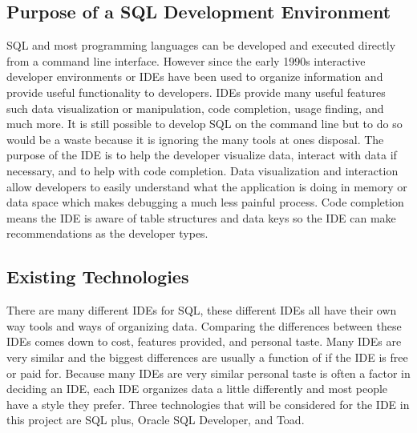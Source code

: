 \documentclass[draftclsnofoot, onecolumn, compsoc, 10pt]{IEEEtran}
\begin{document}
\subsection{Purpose of a SQL Development Environment}
SQL and most programming languages can be developed and executed directly from a command line interface.
However since the early 1990s interactive developer environments or IDEs have been used to organize information and provide useful functionality to developers.
IDEs provide many useful features such data visualization or manipulation, code completion, usage finding, and much more. 
It is still possible to develop SQL on the command line but to do so would be a waste because it is ignoring the many tools at ones disposal. 
The purpose of the IDE is to help the developer visualize data, interact with data if necessary, and to help with code completion.
Data visualization and interaction allow developers to easily understand what the application is doing in memory or data space which makes debugging a much less painful process.
Code completion means the IDE is aware of table structures and data keys so the IDE can make recommendations as the developer types.

\subsection{Existing Technologies}
There are many different IDEs for SQL, these different IDEs all have their own way tools and ways of organizing data. 
Comparing the differences between these IDEs comes down to cost, features provided, and personal taste.
Many IDEs are very similar and the biggest differences are usually a function of if the IDE is free or paid for. 
Because many IDEs are very similar personal taste is often a factor in deciding an IDE, each IDE organizes data a little differently and most people have a style they prefer.
Three technologies that will be considered for the IDE in this project are SQL plus, Oracle SQL Developer, and Toad.
\end{document}
